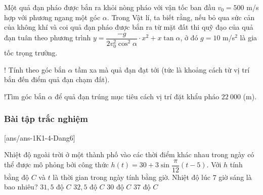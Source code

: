 \begin{bt}%
	Một quả đạn pháo được bắn ra khỏi nòng pháo với vận tốc ban đầu $ v_0=500$ m/s hợp với phương ngang một góc $ \alpha $. Trong Vật lí, ta biết rằng, nếu bỏ qua sức cản của không khí và coi quả đạn pháo được bắn ra từ mặt đất thi quỹ đạo của quả đạn tuân theo phương trình $ y=\dfrac{-g}{2v_0^2\cos^2\alpha}\cdot x^2+x\tan \alpha $, ở đó $g = 10$ m/s$ ^2 $ là gia tốc trọng trường.
	\begin{listEX}[2]
		\item! Tính theo góc bắn $\alpha$ tầm xa mà quả đạn đạt tới (tức là khoảng cách từ vị trí bắn đến điểm quả đạn chạm đất).
		\item!Tìm góc bắn $ \alpha $ để quả đạn trúng mục tiêu cách vị trí đặt khẩu pháo $22~000$ (m).
	\end{listEX}
\end{bt}
\subsubsection{Bài tập trắc nghiệm}
[ans/ans-1K1-4-Dang6]
\begin{ex}%
	Nhiệt độ ngoài trời ở một thành phố vào các thời điểm khác nhau trong ngày có thể được mô phỏng bởi công thức	$h(t)=30+ 3\sin\dfrac{\pi}{12}\left( t-5\right)$. Với $h$ tính bằng độ $C$ và $t$ là thời gian trong ngày tính bằng giờ. Nhiệt độ lúc $ 7 $ giờ sáng là bao nhiêu?
	\choice
	{\True $31{,}5$ độ $ C $}
	{$32{,}5$ độ $ C $}
	{$30$ độ $ C $}
	{$37$ độ $ C $}	
\end{ex}



